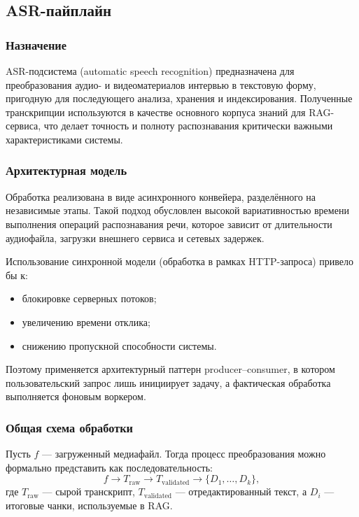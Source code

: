 \documentclass{article}
\begin{document}
\subsection{ASR-пайплайн}

\subsubsection{Назначение}

ASR-подсистема (automatic speech recognition) предназначена для преобразования аудио- и видеоматериалов интервью в текстовую форму, пригодную для последующего анализа, хранения и индексирования. Полученные транскрипции используются в качестве основного корпуса знаний для RAG-сервиса, что делает точность и полноту распознавания критически важными характеристиками системы.

\subsubsection{Архитектурная модель}

Обработка реализована в виде асинхронного конвейера, разделённого на независимые этапы. Такой подход обусловлен высокой вариативностью времени выполнения операций распознавания речи, которое зависит от длительности аудиофайла, загрузки внешнего сервиса и сетевых задержек.

Использование синхронной модели (обработка в рамках HTTP-запроса) привело бы к:
\begin{itemize}
\item блокировке серверных потоков;
\item увеличению времени отклика;
\item снижению пропускной способности системы.
\end{itemize}

Поэтому применяется архитектурный паттерн producer--consumer, в котором пользовательский запрос лишь инициирует задачу, а фактическая обработка выполняется фоновым воркером.

\subsubsection{Общая схема обработки}

Пусть $f$ — загруженный медиафайл. Тогда процесс преобразования можно формально представить как последовательность:
\[
f \rightarrow T_{\text{raw}} \rightarrow T_{\text{validated}} \rightarrow \{D_1, \dots, D_k\},
\]
где $T_{\text{raw}}$ — сырой транскрипт, $T_{\text{validated}}$ — отредактированный текст, а $D_i$ — итоговые чанки, используемые в RAG.
\end{document}
